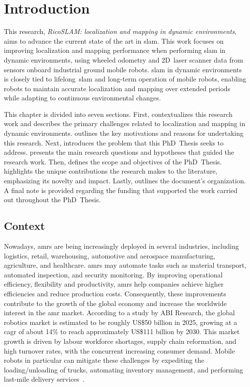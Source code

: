 \chapter{Introduction}\label{chap:intro}

This research,
\textit{RicoSLAM: localization and mapping in dynamic environments},
aims to advance the current state of the art in \gls{slam}.
This work focuses on improving localization and mapping performance when
performing \gls{slam} in dynamic environments, using wheeled odometry and 2D~laser
scanner data from sensors onboard industrial ground mobile robots.
\gls{slam} in dynamic environments is closely tied to lifelong~\gls{slam} and
long-term operation of mobile robots, enabling robots to maintain accurate
localization and mapping over extended periods while adapting to continuous
environmental changes.

This chapter is divided into seven sections.
First,  contextualizes this research work and
describes the primary challenges related to localization and mapping in dynamic
environments.
 outlines the key motivations and reasons for
undertaking this research.
Next,  introduces the problem that this PhD~Thesis
seeks to address.
 presents the main research questions and hypotheses that
guided the research work.
Then,  defines the scope and objectives of the
PhD~Thesis.
 highlights the unique contributions the
research makes to the literature, emphasizing its novelty and impact.
Lastly,  outlines the document's organization.
A final note is provided regarding the funding that supported the work carried
out throughout the PhD~Thesis.

\section{Context}\label{sec:intro:context}
Nowadays, \glspl{amr} are being increasingly deployed in
several industries, including logistics, retail, warehousing, automotive and
aerospace manufacturing, agriculture, and healthcare.
\glspl{amr} may automate tasks such as material transport, automated inspection,
and security monitoring.
By improving operational efficiency, flexibility and productivity,
\glspl{amr} help companies achieve higher efficiencies and
reduce production costs.
Consequently, these improvements contribute to the growth of the global economy
and increase the worldwide interest in the \gls{amr} market.
According to a study by ABI Research, the global robotics market is estimated to
be roughly US\$50 billion in 2025, growing at a \gls{cagr}
of about 14\% to reach approximately US\$111 billion by 2030.
This market growth is driven by labour workforce shortages, supply chain
reformation, and high turnover rates, with the concurrent increasing consumer
demand. Mobile robots in particular can mitigate these challenges by expediting
the loading/unloading of trucks, automating inventory management, and performing
last-mile delivery services~\cite{abi-research:tech-report:2025}.

